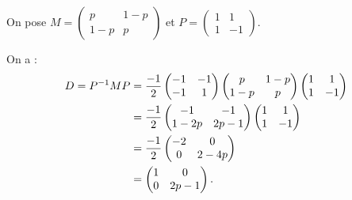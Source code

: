 \begin{corr}[Exercice 1, 2]~\\
On pose \(M=\begin{pmatrix}
p & 1-p \\
1-p & p
\end{pmatrix}\) et \(P=\begin{pmatrix}
1 & 1 \\
1 & -1
\end{pmatrix}\).

On a : \[\begin{aligned}
D=P^{-1} MP&=\dfrac{-1}{2}\begin{pmatrix}
-1 & -1 \\
-1 & 1
\end{pmatrix}\begin{pmatrix}
p & 1-p \\
1-p & p
\end{pmatrix}\begin{pmatrix}
1 & 1 \\
1 & -1
\end{pmatrix} \\
&=\dfrac{-1}{2}\begin{pmatrix}
-1 & -1 \\
1-2p & 2p-1
\end{pmatrix}\begin{pmatrix}
1 & 1 \\
1 & -1
\end{pmatrix} \\
&=\dfrac{-1}{2}\begin{pmatrix}
-2 & 0 \\
0 & 2-4p
\end{pmatrix} \\
&=\begin{pmatrix}
1 & 0 \\
0 & 2p-1
\end{pmatrix}.
\end{aligned}\]


\end{corr}
